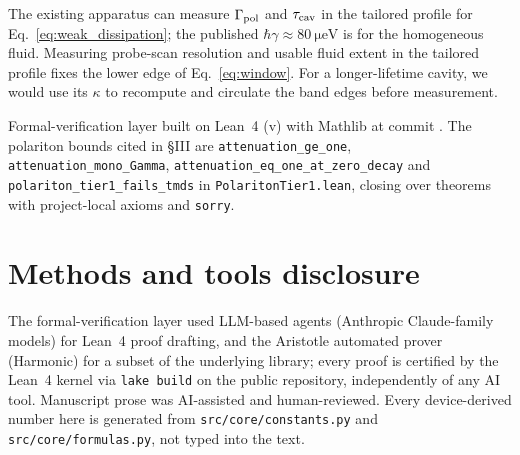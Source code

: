 \documentclass[aps,prl,twocolumn,superscriptaddress,nofootinbib]{revtex4-2}
\begin{document}
The existing apparatus can measure $\Gamma_{\rm pol}$ and
$\tau_{\rm cav}$ in the tailored profile for Eq.~\eqref{eq:weak_dissipation};
the published $\hbar\gamma \approx \SI{80}{\micro\electronvolt}$ is for
the homogeneous fluid. Measuring probe-scan resolution and usable fluid
extent in the tailored profile fixes the lower edge of Eq.~\eqref{eq:window}.
For a longer-lifetime cavity, we would use its $\kappa$ to recompute and
circulate the band edges before measurement.

\begin{acknowledgments}
Formal-verification layer built on Lean~4 (v\leantoolchain) with
Mathlib at commit \texttt{\mathlibrev}. The polariton bounds cited in
\S III are \texttt{attenuation\_ge\_one},
\texttt{attenuation\_mono\_Gamma},
\texttt{attenuation\_eq\_one\_at\_zero\_decay} and
\texttt{polariton\_tier1\_fails\_tmds} in \texttt{PolaritonTier1.lean},
closing over \bundleTheorems{} theorems with \axiomcount{}
project-local axioms and \sorrycount{} \texttt{sorry}.
\end{acknowledgments}

\section*{Methods and tools disclosure}
The formal-verification layer used LLM-based agents (Anthropic
Claude-family models) for Lean~4 proof drafting, and the Aristotle
automated prover (Harmonic) for a subset of the underlying library;
every proof is certified by the Lean~4 kernel via \texttt{lake
build} on the public repository, independently of any AI tool.
Manuscript prose was AI-assisted and human-reviewed. Every
device-derived number here is generated from
\texttt{src/core/constants.py} and \texttt{src/core/formulas.py},
not typed into the text.
\end{document}
